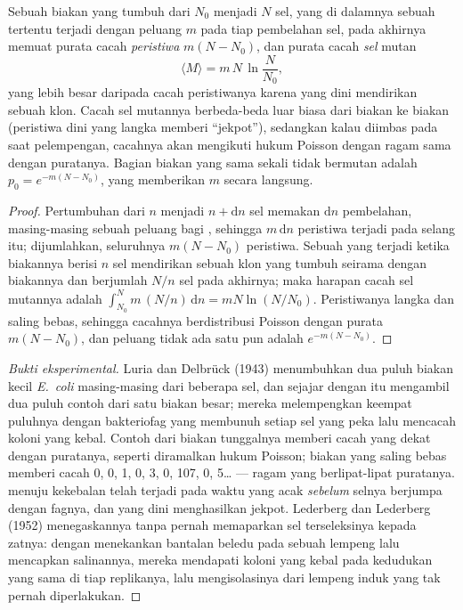 \begin{theorem}\label{thm:b2:genome-diversification:luria}
Sebuah biakan yang tumbuh dari $N_0$ menjadi $N$ sel, yang di dalamnya
sebuah  tertentu terjadi dengan peluang $m$ pada tiap pembelahan
sel, pada akhirnya memuat purata cacah \emph{peristiwa} 
$m(N - N_0)$, dan purata cacah \emph{sel} mutan
\[
\langle M\rangle = m\,N\,\ln\frac{N}{N_0},
\]
yang lebih besar daripada cacah peristiwanya karena  yang dini
mendirikan sebuah klon. Cacah sel mutannya berbeda-beda luar biasa dari
biakan ke biakan (peristiwa dini yang langka memberi ``jekpot''),
sedangkan kalau  diimbas pada saat pelempengan, cacahnya akan
mengikuti hukum Poisson dengan ragam sama dengan puratanya. Bagian
biakan yang sama sekali tidak bermutan adalah $p_0 = e^{-m(N - N_0)}$,
yang memberikan $m$ secara langsung.
\end{theorem}
\begin{proof}
Pertumbuhan dari $n$ menjadi $n + \mathrm{d}n$ sel memakan
$\mathrm{d}n$ pembelahan, masing-masing sebuah peluang bagi ,
sehingga $m\,\mathrm{d}n$ peristiwa terjadi pada selang itu; dijumlahkan,
seluruhnya $m(N - N_0)$ peristiwa. Sebuah  yang terjadi ketika
biakannya berisi $n$ sel mendirikan sebuah klon yang tumbuh seirama
dengan biakannya dan berjumlah $N/n$ sel pada akhirnya; maka harapan
cacah sel mutannya adalah
$\int_{N_0}^{N} m\,(N/n)\,\mathrm{d}n = mN\ln(N/N_0)$. Peristiwanya
langka dan saling bebas, sehingga cacahnya berdistribusi Poisson dengan
purata $m(N - N_0)$, dan peluang tidak ada satu pun adalah
$e^{-m(N - N_0)}$.
\end{proof}
\begin{proof}[Bukti eksperimental]
Luria dan Delbrück (1943) menumbuhkan dua puluh biakan kecil
\emph{E.~coli} masing-masing dari beberapa sel, dan sejajar dengan itu
mengambil dua puluh contoh dari satu biakan besar; mereka melempengkan
keempat puluhnya dengan bakteriofag yang membunuh setiap sel yang peka
lalu mencacah koloni yang kebal. Contoh dari biakan tunggalnya memberi
cacah yang dekat dengan puratanya, seperti diramalkan hukum Poisson;
biakan yang saling bebas memberi cacah 0, 0, 1, 0, 3, 0, 107, 0,
5\dots{} --- ragam yang berlipat-lipat puratanya.  menuju
kekebalan telah terjadi pada waktu yang acak \emph{sebelum} selnya
berjumpa dengan fagnya, dan yang dini menghasilkan jekpot. Lederberg
dan Lederberg (1952) menegaskannya tanpa pernah memaparkan sel
terseleksinya kepada zatnya: dengan menekankan bantalan beledu pada
sebuah lempeng lalu mencapkan salinannya, mereka mendapati koloni yang
kebal pada kedudukan yang sama di tiap replikanya, lalu mengisolasinya
dari lempeng induk yang tak pernah diperlakukan.
\end{proof}


